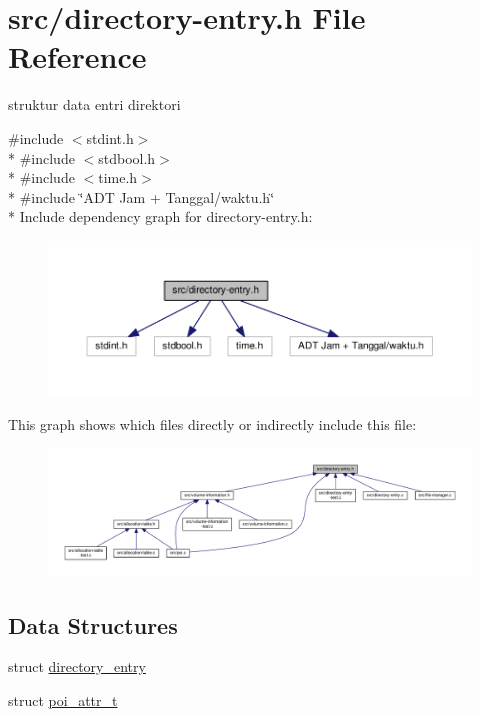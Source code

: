 \hypertarget{directory-entry_8h}{\section{src/directory-\/entry.h File Reference}
\label{directory-entry_8h}
}


struktur data entri direktori  


{\ttfamily \#include $<$stdint.\-h$>$}\\*
{\ttfamily \#include $<$stdbool.\-h$>$}\\*
{\ttfamily \#include $<$time.\-h$>$}\\*
{\ttfamily \#include \char`\"{}A\-D\-T Jam + Tanggal/waktu.\-h\char`\"{}}\\*
Include dependency graph for directory-\/entry.h\-:\nopagebreak
\begin{figure}[H]
\begin{center}
\leavevmode
\includegraphics[width=350pt]{directory-entry_8h__incl}
\end{center}
\end{figure}
This graph shows which files directly or indirectly include this file\-:\nopagebreak
\begin{figure}[H]
\begin{center}
\leavevmode
\includegraphics[width=350pt]{directory-entry_8h__dep__incl}
\end{center}
\end{figure}
\subsection*{Data Structures}
\begin{DoxyCompactItemize}
\item 
struct \hyperlink{structdirectory__entry}{directory\-\_\-entry}
\item 
struct \hyperlink{structpoi__attr__t}{poi\-\_\-attr\-\_\-t}
\end{DoxyCompactItemize}
